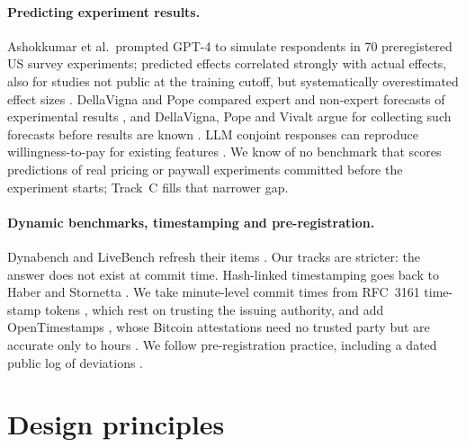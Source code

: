 \documentclass[11pt]{article}
\begin{document}
\paragraph{Predicting experiment results.} Ashokkumar et al.\ prompted GPT-4 to simulate respondents in 70 preregistered US survey experiments; predicted effects correlated strongly with actual effects, also for studies not public at the training cutoff, but systematically overestimated effect sizes \citep{ashokkumar2026predict}. DellaVigna and Pope compared expert and non-expert forecasts of experimental results \citep{dellavigna2018predicting}, and DellaVigna, Pope and Vivalt argue for collecting such forecasts before results are known \citep{dellavigna2019predict}. LLM conjoint responses can reproduce willingness-to-pay for existing features \citep{brand2025llms}. We know of no benchmark that scores predictions of real pricing or paywall experiments committed before the experiment starts; Track~C fills that narrower gap.

\paragraph{Dynamic benchmarks, timestamping and pre-registration.} Dynabench and LiveBench refresh their items \citep{kiela2021dynabench,white2025livebench}. Our tracks are stricter: the answer does not exist at commit time. Hash-linked timestamping goes back to Haber and Stornetta \citep{haber1991timestamp}. We take minute-level commit times from RFC~3161 time-stamp tokens \citep{rfc3161}, which rest on trusting the issuing authority, and add OpenTimestamps \citep{opentimestamps}, whose Bitcoin attestations need no trusted party but are accurate only to hours \citep{todd2016ots}. We follow pre-registration practice, including a dated public log of deviations \citep{nosek2018preregistration}.

\section{Design principles}
\end{document}
